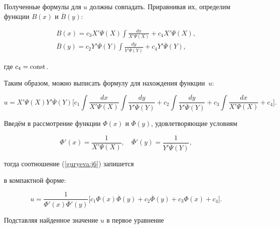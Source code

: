 Полученные формулы для $u$ должны совпадать. Приравнивая их, определим функции $B(x)$ и $\overline{B}(y)$:


\begin{gather*}


B(x)=c_{3} X'\Psi(X) \int \frac{dx}{X'\Psi(X)}+c_{4} X'\Psi(X), \\


\overline{B}(y)=c_{2}Y'\overline{\Psi}(Y)


\int \frac{d y}{Y'\overline{\Psi}(Y)}+c_{4}Y'\overline{\Psi}(Y),


\end{gather*}


где $c_{4} = \rm const$.


Таким образом, можно выписать формулу для нахождения функции~$u$:


\begin{equation} \label{guryeva:j6}


u=X'\Psi(X)Y'\overline{\Psi}(Y)\biggl[ c_{1}


 \!\int\!  \frac{d


x}{X'\Psi(X)} \!\int\!  \frac{d


y}{Y'\overline{\Psi}(Y)}+c_{2} \int


 \frac{d y}{Y'\overline{\Psi}(Y)}+


c_{3} \!\int\!  \frac{d


x}{X'\Psi(X)}+c_{4}  \biggr].


\end{equation}





Введём в рассмотрение функции $\Phi(x)$ и $\overline{\Phi}(y)$,  удовлетворяющие условиям


$$\Phi'(x)=\frac{1}{X'\Psi(X)},\quad  \overline{\Phi}'(y)=\frac{1}{Y'\overline{\Psi}(Y)},$$


тогда соотношение (\ref{guryeva:j6}) запишется


в компактной форме:


\begin{equation} \label{guryeva:j7}


u=\frac{1}{\Phi'(x)\overline{\Phi}'(y)}\bigl[c_{1}\Phi(x)\overline{\Phi}(y)+


c_{2}\overline{\Phi}(y)+c_{3}\Phi(x)+c_{4} \bigr].


\end{equation}





Подставляя найденное  значение $u$  в первое уравнение


